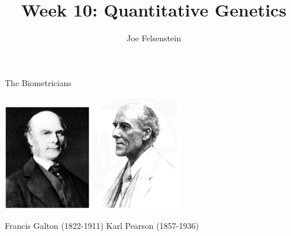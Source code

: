 \documentclass[pdf,bluish,slideColor,colorBG]{prosper}
\title{Week 10: Quantitative Genetics}
\author{Joe Felsenstein}
\begin{document}
\def\Prob{{\rm Prob\;}}
\def\prob{{\rm \;Prob\;}}

\maketitle

{\parindent=0in

%
%
%
% 
% 
% 
% 
% 
\begin{slide}[Replace]{The Biometricians}

\hspace*{0in} \hfill \includegraphics[width=1.5in]{galton.ps}
\hfill \includegraphics[width=1.5in]{pearson.ps} \hfill {~~}

\hspace*{0in} \hfill Francis Galton (1822-1911) \hfill Karl Pearson (1857-1936)
\hfill {~~}

\end{slide}

%
%
%
%

}
\end{document}
